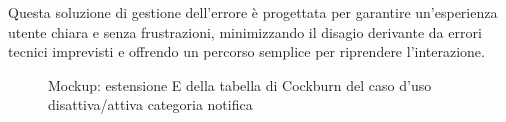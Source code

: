 Questa soluzione di gestione dell'errore è progettata per garantire un'esperienza utente chiara e senza frustrazioni, minimizzando il disagio derivante da errori tecnici imprevisti e offrendo un percorso semplice per riprendere l'interazione.
\begin{figure}[ht]
    \centering
    \caption{Mockup: estensione E della tabella di Cockburn del caso d'uso disattiva/attiva categoria notifica}
    \label{fig:tikz_flow}
\end{figure}

\newpage

